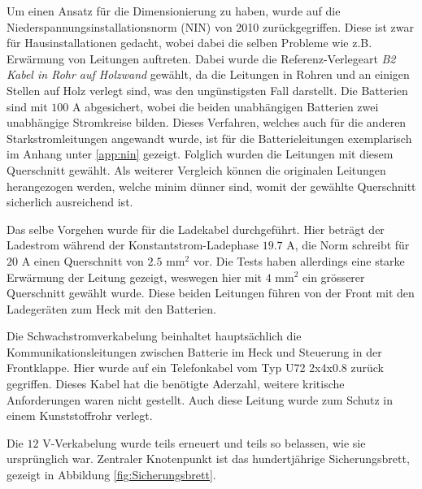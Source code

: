 Um einen Ansatz für die Dimensionierung zu haben, wurde auf die Niederspannungsinstallationsnorm (NIN) von 2010 \cite{NIN} zurückgegriffen. Diese ist zwar für Hausinstallationen gedacht, wobei dabei die selben Probleme wie z.B. Erwärmung von Leitungen auftreten. Dabei wurde die Referenz-Verlegeart \textit{B2 Kabel in Rohr auf Holzwand} gewählt, da die Leitungen in Rohren und an einigen Stellen auf Holz verlegt sind, was den ungünstigsten Fall darstellt. Die Batterien sind mit $100$ A abgesichert, wobei die beiden unabhängigen Batterien zwei unabhängige Stromkreise bilden. Dieses Verfahren, welches auch für die anderen Starkstromleitungen angewandt wurde, ist für die Batterieleitungen exemplarisch im Anhang unter \ref{app:nin} gezeigt. Folglich wurden die Leitungen mit diesem Querschnitt gewählt. Als weiterer Vergleich können die originalen Leitungen herangezogen werden, welche minim dünner sind, womit der gewählte Querschnitt sicherlich ausreichend ist.

Das selbe Vorgehen wurde für die Ladekabel durchgeführt. Hier beträgt der Ladestrom während der Konstantstrom-Ladephase $19.7$ A, die Norm schreibt für $20$ A einen Querschnitt von $2.5$ mm$^2$ vor. Die Tests haben allerdings eine starke Erwärmung der Leitung gezeigt, weswegen hier mit $4$ mm$^2$ ein grösserer Querschnitt gewählt wurde. Diese beiden Leitungen führen von der Front mit den Ladegeräten zum Heck mit den Batterien.

Die Schwachstromverkabelung beinhaltet hauptsächlich die Kommunikationsleitungen zwischen Batterie im Heck und Steuerung in der Frontklappe. Hier wurde auf ein Telefonkabel vom Typ U72 2x4x0.8 \cite{u72} zurück gegriffen. Dieses Kabel hat die benötigte Aderzahl, weitere kritische Anforderungen waren nicht gestellt. Auch diese Leitung wurde zum Schutz in einem Kunststoffrohr verlegt.

Die $12$ V-Verkabelung wurde teils erneuert und teils so belassen, wie sie ursprünglich war. Zentraler Knotenpunkt ist das hundertjährige Sicherungsbrett, gezeigt in Abbildung \ref{fig:Sicherungsbrett}.

